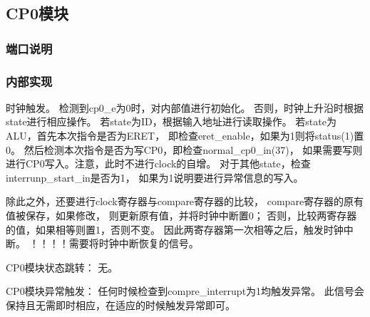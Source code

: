     \subsection{CP0模块}
        \subsubsection{端口说明}
            
        \subsubsection{内部实现}
            时钟触发。%
            检测到cp0\_e为0时，对内部值进行初始化。%
            否则，时钟上升沿时根据state进行相应操作。%
            若state为ID，根据输入地址进行读取操作。%
            若state为ALU，首先本次指令是否为ERET，%
            即检查eret\_enable，如果为1则将status(1)置0。%
            然后检测本次指令是否为写CP0，即检查normal\_cp0\_in(37)，%
            如果需要写则进行CP0写入。注意，此时不进行clock的自增。%
            对于其他state，检查interrunp\_start\_in是否为1，%
            如果为1说明要进行异常信息的写入。%
            
            除此之外，还要进行clock寄存器与compare寄存器的比较，%
            compare寄存器的原有值被保存，如果修改，%
            则更新原有值，并将时钟中断置0；%
            否则，比较两寄存器的值，如果相等则置1，否则不变。%
            因此两寄存器第一次相等之后，触发时钟中断。%
            ！！！！需要将时钟中断恢复的信号。

            CP0模块状态跳转：%
            无。%

            CP0模块异常触发：%
            任何时候检查到compre\_interrupt为1均触发异常。%
            此信号会保持且无需即时相应，在适应的时候触发异常即可。

